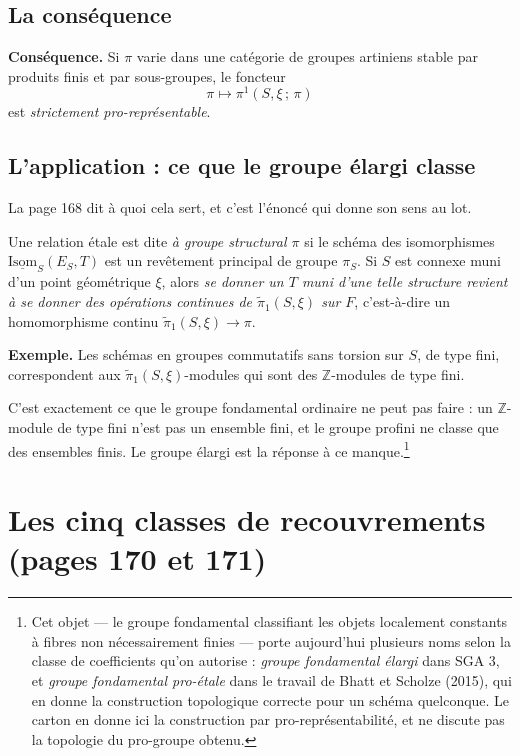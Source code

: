 \documentclass[11pt,a4paper]{article}
\begin{document}
\subsection*{La conséquence}

\textbf{Conséquence.} Si $\pi$ varie dans une catégorie de groupes artiniens
stable par produits finis et par sous-groupes, le foncteur
\[
  \pi \longmapsto \pi^{1}(S, \xi\,;\, \pi)
\]
est \emph{strictement pro-représentable}.

\subsection*{L'application : ce que le groupe élargi classe}

La page 168 dit à quoi cela sert, et c'est l'énoncé qui donne son sens au lot.

Une relation étale est dite \emph{à groupe structural $\pi$} si le schéma des
isomorphismes $\underline{\mathrm{Isom}}_{S}(E_{S}, T)$ est un revêtement
principal de groupe $\pi_{S}$. Si $S$ est connexe muni d'un point géométrique
$\xi$, alors \emph{se donner un $T$ muni d'une telle structure revient à se
donner des opérations continues de $\tilde{\pi}_{1}(S, \xi)$ sur $F$},
c'est-à-dire un homomorphisme continu $\tilde{\pi}_{1}(S,\xi) \to \pi$.

\textbf{Exemple.} Les schémas en groupes commutatifs sans torsion sur $S$, de
type fini, correspondent aux $\tilde{\pi}_{1}(S,\xi)$-modules qui sont des
$\mathbb{Z}$-modules de type fini.

C'est exactement ce que le groupe fondamental ordinaire ne peut pas faire : un
$\mathbb{Z}$-module de type fini n'est pas un ensemble fini, et le groupe
profini ne classe que des ensembles finis. Le groupe élargi est la réponse à ce
manque.\footnote{Cet objet --- le groupe fondamental classifiant les objets
localement constants à fibres non nécessairement finies --- porte aujourd'hui
plusieurs noms selon la classe de coefficients qu'on autorise : \emph{groupe
fondamental élargi} dans SGA 3, et \emph{groupe fondamental pro-étale} dans le
travail de Bhatt et Scholze (2015), qui en donne la construction topologique
correcte pour un schéma quelconque. Le carton en donne ici la construction par
pro-représentabilité, et ne discute pas la topologie du pro-groupe obtenu.}

\section*{Les cinq classes de recouvrements (pages 170 et 171)}
\end{document}
